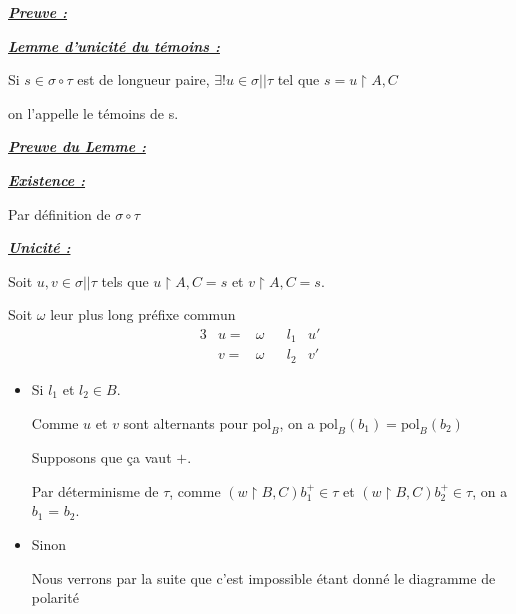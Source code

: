 \documentclass[a4paper,12ptCOUCOU
]{article}
\newlength{\mydepth}
\newlength{\myheight}
\newenvironment{answer}
{\par\begin{lrbox}{\mybox}\quad\begin{minipage}{\linewidth}\color{black}\setlength{\parskip}{10pt plus 1pt minus 1pt}\vspace*{-.7\baselineskip}}
{\end{minipage}\end{lrbox}
\settodepth{\mydepth}{\usebox{\mybox}}
\settoheight{\myheight}{\usebox{\mybox}}
\addtolength{\myheight}{\mydepth}
\noindent\makebox[0pt]{
  \color{gray}\hspace{-0pt}\rule[-\mydepth]{1pt}{\myheight}}
\usebox{\mybox}
  }
\begin{document}
\begin{samepage}\textbf{\textit{\underline{ Preuve : }}} \begin{answer}

\begin{samepage}\textbf{\textit{\underline{ Lemme d'unicité du témoins : }}} \begin{answer}
Si $s \in \sigma \circ \tau$ est de longueur paire,
$\exists ! u \in \sigma||\tau $ tel que $ s = u \upharpoonright A,C$

on l'appelle le témoins de s.

\end{answer}\end{samepage}

\begin{samepage}\textbf{\textit{\underline{ Preuve du Lemme : }}} \begin{answer}
\begin{samepage}\textbf{\textit{\underline{ Existence : }}} \begin{answer}
Par définition de $\sigma \circ \tau$
\end{answer}\end{samepage}
\begin{samepage}\textbf{\textit{\underline{ Unicité : }}} \begin{answer}
Soit $u,v \in \sigma || \tau$ tels que
$u \upharpoonright A,C = s$ et $v \upharpoonright A, C = s$.

Soit $\omega$ leur plus long préfixe commun
\begin{alignat*}{3}
&u = &\omega &&l_1 &u'\\
&v = &\omega &&l_2 &v'
\end{alignat*}
\begin{itemize}
\item Si $l_1$ et  $l_2 \in B$.

Comme $u$ et $v$ sont alternants pour $\text{pol}_B$,
on a $\text{pol}_B(b_1) = \text{pol}_B(b_2)$

Supposons que ça vaut $+$.

Par déterminisme de $\tau$, comme
$(w\upharpoonright B,C)b_1^+ \in \tau$ et
$(w\upharpoonright B,C)b_2^+ \in \tau$,
on a $b_1$ = $b_2$.

\item Sinon

Nous verrons par la suite que c'est impossible étant donné
le diagramme de polarité

\end{itemize}



\end{answer}\end{samepage}
\end{answer}\end{samepage}

\end{answer}\end{samepage}
\printbibliography
\end{document}
